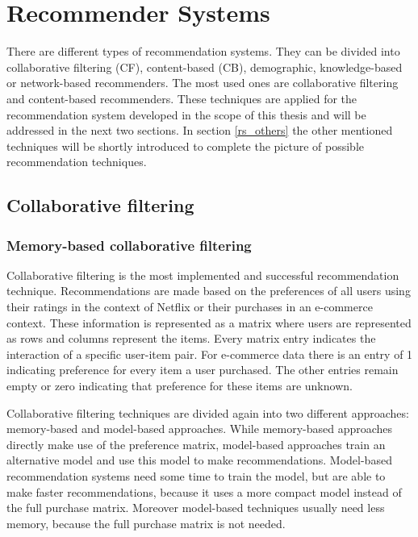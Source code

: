 \documentclass[10pt]{reportMaster}
\begin{document}
\section{Recommender Systems}
\label{sec:recommenderSystems}
There are different types of recommendation systems.
They can be divided into collaborative filtering (CF), content-based (CB), demographic, knowledge-based or network-based recommenders. %
The most used ones are collaborative filtering and content-based recommenders.
These techniques are applied for the recommendation system developed in the scope of this thesis and will be addressed in the next two sections.
In section \ref{rs_others} the other mentioned techniques will be shortly introduced to complete the picture of possible recommendation techniques.

\subsection{Collaborative filtering}
\label{sec:collaborativeFiltering}
\label{rs_cf}

\subsubsection{Memory-based collaborative filtering}
\label{sec:memBasedCF}
Collaborative filtering is the most implemented and successful recommendation technique. %
Recommendations are made based on the preferences of all users using their ratings in the context of Netflix or their purchases in an e-commerce context.
These information is represented as a matrix where users are represented as rows and columns represent the items.
Every matrix entry indicates the interaction of a specific user-item pair.
For e-commerce data there is an entry of 1 indicating preference for every item a user purchased.
The other entries remain empty or zero indicating that preference for these items are unknown. %

Collaborative filtering techniques are divided again into two different approaches: memory-based and model-based approaches.
While memory-based approaches directly make use of the preference matrix, model-based approaches train an alternative model and use this model to make recommendations.
Model-based recommendation systems need some time to train the model, but are able to make faster recommendations, because it uses a more compact model instead of the full purchase matrix.
Moreover model-based techniques usually need less memory, because the full purchase matrix is not needed.
\end{document}
